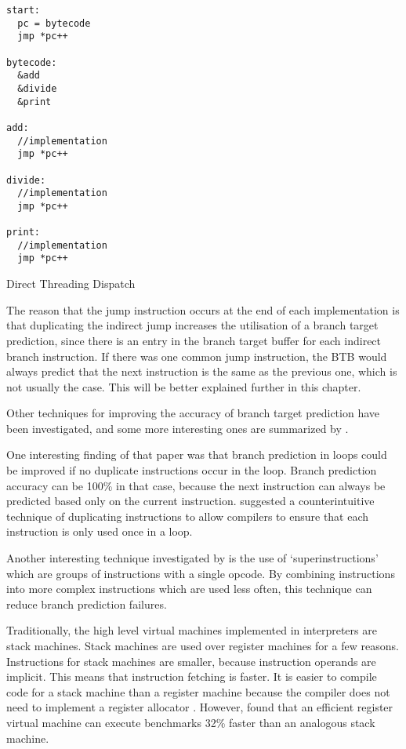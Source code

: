 		\begin{myfigure}
				\begin{lstlisting}
start:
  pc = bytecode
  jmp *pc++

bytecode:
  &add
  &divide
  &print

add:
  //implementation
  jmp *pc++

divide:
  //implementation
  jmp *pc++

print:
  //implementation
  jmp *pc++

				\end{lstlisting}
				\caption{Direct Threading Dispatch}
				\label{fig:directthreading}
		\end{myfigure}
		
		The reason that the jump instruction occurs at the end of each implementation is that duplicating the indirect jump increases the utilisation of a branch target prediction, since there is an entry in the branch target buffer for each indirect branch instruction. If there was one common jump instruction, the BTB would always predict that the next instruction is the same as the previous one, which is not usually the case. This will be better explained further in this chapter.
		
		Other techniques for improving the accuracy of branch target prediction have been investigated, and some more interesting ones are summarized by \cite{optimizingindirectbranch}. 
		
		One interesting finding of that paper was that branch prediction in loops could be improved if no duplicate instructions occur in the loop. Branch prediction accuracy can be 100\% in that case, because the next instruction can always be predicted based only on the current instruction. \citeauthor{optimizingindirectbranch} suggested a counterintuitive technique of duplicating instructions to allow compilers to ensure that each instruction is only used once in a loop.
		
		Another interesting technique investigated by \citeauthor{optimizingindirectbranch} is the use of `superinstructions' which are groups of instructions with a single opcode. By combining instructions into more complex instructions which are used less often, this technique can reduce branch prediction failures.
		
		Traditionally, the high level virtual machines implemented in interpreters are stack machines. Stack machines are used over register machines for a few reasons. Instructions for stack machines are smaller, because instruction operands are implicit. This means that instruction fetching is faster. It is easier to compile code for a stack machine than a register machine because the compiler does not need to implement a register allocator \citep{caseregistervm}. However, \cite{stackregistershowdown} found that an efficient register virtual machine can execute benchmarks 32\% faster than an analogous stack machine. 
		
